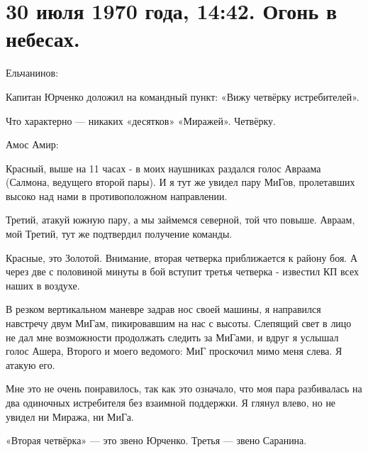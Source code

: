 \section{30 июля 1970 года, 14:42. Огонь в небесах.}

Ельчанинов:

\begin{textcitation}
	Капитан Юрченко доложил на командный пункт: «Вижу четвёрку истребителей».
\end{textcitation}

Что характерно — никаких «десятков» «Миражей». Четвёрку.

Амос Амир:

\begin{textcitation}
	Красный, выше на 11 часах - в моих наушниках раздался голос Авраама (Салмона, ведущего второй пары). И я тут же увидел пару МиГов, пролетавших высоко над нами в противоположном направлении.
	
	Третий, атакуй южную пару, а мы займемся северной, той что повыше. Авраам, мой Третий, тут же подтвердил получение команды.
	
	Красные, это Золотой. Внимание, вторая четверка приближается к району боя. А через две с половиной минуты в бой вступит третья четверка - известил КП всех наших в воздухе.
	
	В резком вертикальном маневре задрав нос своей машины, я направился навстречу двум МиГам, пикировавшим на нас с высоты. Слепящий свет в лицо не дал мне возможности продолжать следить за МиГами, и вдруг я услышал голос Ашера, Второго и моего ведомого: МиГ проскочил мимо меня слева. Я атакую его.
	
	Мне это не очень понравилось, так как это означало, что моя пара разбивалась на два одиночных истребителя без взаимной поддержки. Я глянул влево, но не увидел ни Миража, ни МиГа.
\end{textcitation}

«Вторая четвёрка» — это звено Юрченко. Третья — звено Саранина.

